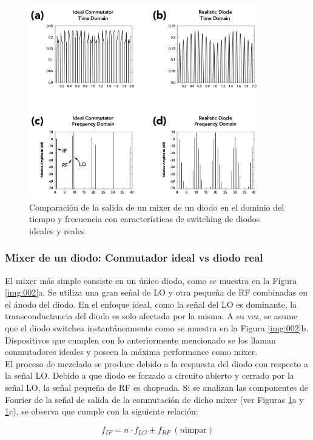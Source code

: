 \documentclass[a4paper,10pt]{article}
\begin{document}
	\begin{figure}[!htb]
		\centering
		\includegraphics[width=10cm]
		{Images/OneDiodeMixerFunction.png}
		\caption{Comparaci\'on de la salida de un mixer de un diodo en el 
		dominio del tiempo y frecuencia con características de switching 
		de diodos ideales y reales} 
		\label{img:003} 
	\end{figure}


	\subsubsection{Mixer de un diodo: Conmutador ideal vs diodo real}
	\indent El mixer más simple consiste en un único diodo, como se muestra en 
	la Figura \ref{img:002}a. Se utiliza una gran señal de LO y otra pequeña de 
	RF combinadas en el ánodo del diodo. En el enfoque ideal, como la señal del 
	LO es dominante, la transconductancia del diodo es solo afectada por la 
	misma. A su vez, se asume que el diodo switchea instantáneamente como se 
	muestra en la Figura \ref{img:002}b. Dispositivos que cumplen con lo 
	anteriormente mencionado se los llaman conmutadores ideales y poseen la 
	máxima performance como mixer. \\
	\indent El proceso de mezclado se produce debido a la respuesta del diodo 
	con respecto a la señal LO. Debido a que diodo es forzado a circuito abierto
	y cerrado por la señal LO, la señal pequeña de RF es chopeada. Si se 
	analizan las componentes de Fourier de la señal de salida de la conmutación 
	de dicho mixer (ver Figuras \ref{img:003}a y \ref{img:003}c), se observa que
	cumple con la siguiente relación:

	\begin{equation*}
		f_{IF} = n\cdot f_{LO}\pm f_{RF}~(n\text{impar})
	\end{equation*}
\end{document}
